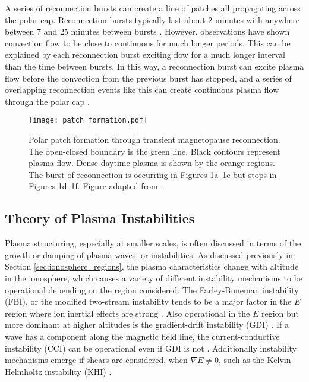 A series of reconnection bursts can create a line of patches all propagating across the polar cap.  Reconnection bursts typically last about 2 minutes with anywhere between 7 and 25 minutes between bursts \citep{Foster1984,Etemadi1988,Lockwood1992b}.  However, observations have shown convection flow to be close to continuous for much longer periods.  This can be explained by each reconnection burst exciting flow for a much longer interval than the time between bursts.  In this way, a reconnection burst can excite plasma flow before the convection from the previous burst has stopped, and a series of overlapping reconnection events like this can create continuous plasma flow through the polar cap \citep{Cowley1991}. 

\begin{figure}
	\texttt{[image: patch\_formation.pdf]}
	\caption[Polar patch formation]{Polar patch formation through transient magnetopause reconnection.  The open-closed boundary is the green line.  Black contours represent plasma flow.  Dense daytime plasma is shown by the orange regions.  The burst of reconnection is occurring in Figures \ref{fig:patch_formation}a--\ref{fig:patch_formation}c but stops in Figures \ref{fig:patch_formation}d--\ref{fig:patch_formation}f.  Figure adapted from \citet{Cowley1991}.}
	\label{fig:patch_formation}
\end{figure}

\subsection{Theory of Plasma Instabilities}
\label{sec:lit_instabilities}
Plasma structuring, especially at smaller scales, is often discussed in terms of the growth or damping of plasma waves, or instabilities.  As discussed previously in Section \ref{sec:ionosphere_regions}, the plasma characteristics change with altitude in the ionosphere, which causes a variety of different instability mechanisms to be operational depending on the region considered.  The Farley-Buneman instability (FBI), or the modified two-stream instability tends to be a major factor in the \(E\) region where ion inertial effects are strong \citep{Farley1963,Buneman1963}.  Also operational in the \(E\) region but more dominant at higher altitudes is the gradient-drift instability (GDI) \citep{Simon1963,Hoh1963,Linson1970}.  If a wave has a component along the magnetic field line, the current-conductive instability (CCI) can be operational even if GDI is not \citep{Hoh1960,Ossakow1979,Chaturvedi1981}.  Additionally instability mechanisms emerge if shears are considered, when \(\nabla E \neq 0\), such as the Kelvin-Helmholtz instability (KHI) \citep{Kintner1977,DAngelo1965}.

